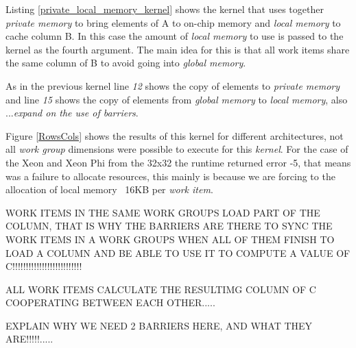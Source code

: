 
\par{Listing \ref{private_local_memory_kernel} shows the kernel that uses together \emph{private memory} to bring elements of A to 
    on-chip memory and \emph{local memory} to cache column B. In 
    this case the amount of \emph{local memory} to use is passed to the kernel as the fourth argument. The main idea for this is
    that all work items share the same column of B to avoid going into \emph{global memory}.}

\par{As in the previous kernel line \emph{12} shows the copy of elements to \emph{private memory} and line \emph{15} shows the 
    copy of elements from \emph{global memory} to \emph{local memory}, also ...\emph{expand on the use of barriers}.}

\par{Figure \ref{RowsCols} shows the results of this kernel for different architectures, not all \emph{work group} dimensions 
    were possible to execute for this \emph{kernel}. For the case of the Xeon and Xeon Phi from the 32x32 the runtime returned
    error -5, that means was a failure to allocate resources\cite{opencl_error}, this mainly is because we are forcing to the 
    allocation of local memory ~16KB per \emph{work item}.

\par{{\color{red}WORK ITEMS IN THE SAME WORK GROUPS LOAD PART OF THE COLUMN, THAT IS WHY THE BARRIERS ARE THERE
    TO SYNC THE WORK ITEMS IN A WORK GROUPS WHEN ALL OF THEM FINISH TO LOAD A COLUMN AND BE ABLE TO USE IT TO COMPUTE A VALUE OF 
    C!!!!!!!!!!!!!!!!!!!!!!!!!!}}
\par{{\color{red}ALL WORK ITEMS CALCULATE THE RESULTIMG COLUMN OF C COOPERATING BETWEEN EACH OTHER.....}}
\par{{\color{red}EXPLAIN WHY WE NEED 2 BARRIERS HERE, AND WHAT THEY ARE!!!!!.....}}

}
